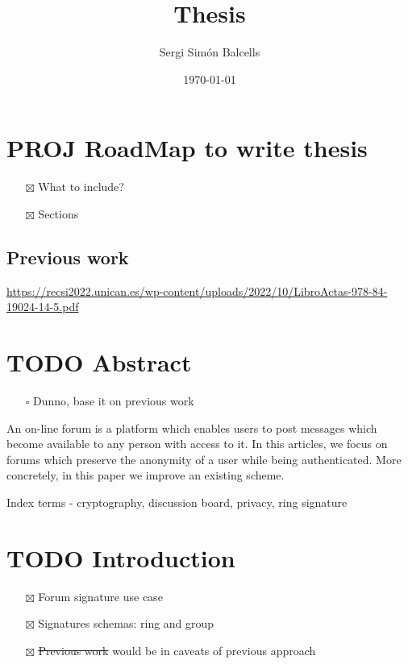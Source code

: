 \documentclass[11pt]{article}
\author{Sergi Simón Balcells}
\date{\today}
\title{Thesis}
\begin{document}
\maketitle
\tableofcontents



\section{{\bfseries\sffamily PROJ} RoadMap to write thesis}
\label{sec:org587f28d}
\begin{itemize}
\item[{$\boxtimes$}] What to include?
\item[{$\boxtimes$}] Sections
\end{itemize}
\subsection{Previous work}
\label{sec:org017a5ec}
\url{https://recsi2022.unican.es/wp-content/uploads/2022/10/LibroActas-978-84-19024-14-5.pdf}

\section{{\bfseries\sffamily TODO} Abstract}
\label{sec:orgdaf8c78}
\begin{itemize}
\item[{$\square$}] Dunno, base it on previous work
\end{itemize}
An on-line forum is a platform which enables users to post messages which become available to any
person with access to it. In this articles, we focus on forums which preserve the anonymity of a
user while being authenticated. More concretely, in this paper we improve an existing scheme.

Index terms - cryptography, discussion board, privacy, ring signature
\section{{\bfseries\sffamily TODO} Introduction}
\label{sec:orgf1b61fe}
\begin{itemize}
\item[{$\boxtimes$}] Forum signature use case
\item[{$\boxtimes$}] Signatures schemas: ring and group
\item[{$\boxtimes$}] \sout{Previous work} would be in caveats of previous approach
\end{itemize}
\end{document}
